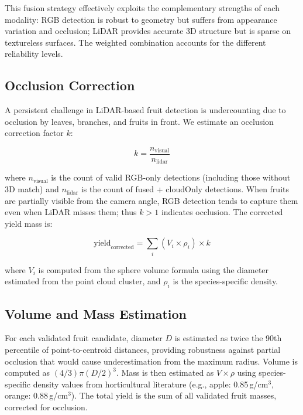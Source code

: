 \documentclass[12pt,a4paper]{article}
\begin{document}
This fusion strategy effectively exploits the complementary strengths of each modality: RGB detection is robust to geometry but suffers from appearance variation and occlusion; LiDAR provides accurate 3D structure but is sparse on textureless surfaces. The weighted combination accounts for the different reliability levels.

\subsection{Occlusion Correction}

A persistent challenge in LiDAR-based fruit detection is undercounting due to occlusion by leaves, branches, and fruits in front. We estimate an occlusion correction factor $k$:

\begin{equation}
k = \frac{n_{\mathrm{visual}}}{n_{\mathrm{lidar}}}
\label{eq:occlusion-k}
\end{equation}

where $n_{\mathrm{visual}}$ is the count of valid RGB-only detections (including those without 3D match) and $n_{\mathrm{lidar}}$ is the count of fused + cloudOnly detections. When fruits are partially visible from the camera angle, RGB detection tends to capture them even when LiDAR misses them; thus $k > 1$ indicates occlusion. The corrected yield mass is:

\begin{equation}
\mathrm{yield}_{\mathrm{corrected}} = \sum_i (V_i \times \rho_i) \times k
\label{eq:yield-corrected}
\end{equation}

where $V_i$ is computed from the sphere volume formula using the diameter estimated from the point cloud cluster, and $\rho_i$ is the species-specific density.

\subsection{Volume and Mass Estimation}

For each validated fruit candidate, diameter $D$ is estimated as twice the 90th percentile of point-to-centroid distances, providing robustness against partial occlusion that would cause underestimation from the maximum radius. Volume is computed as $(4/3)\pi(D/2)^3$. Mass is then estimated as $V \times \rho$ using species-specific density values from horticultural literature (e.g., apple: 0.85\,g/cm$^3$, orange: 0.88\,g/cm$^3$). The total yield is the sum of all validated fruit masses, corrected for occlusion.
\end{document}
